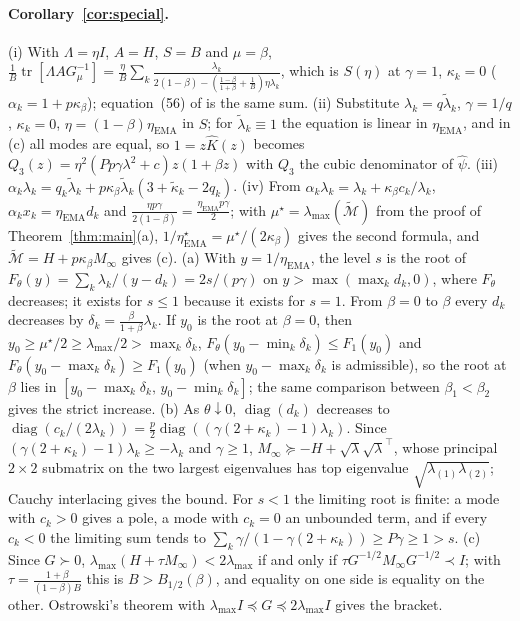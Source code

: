 \documentclass[11pt]{article}
\theoremstyle{remark}
\newcommand{\tr}{\operatorname{tr}}
\begin{document}
\paragraph{Corollary~\ref{cor:special}.}
(i) With $\Lambda=\eta I$, $A=H$, $S=B$ and $\mu=\beta$, $\frac1B\tr[\Lambda AG_\mu^{-1}]=\frac{\eta}{B}\sum_k\frac{\lambda_k}{2(1-\beta)-(\frac{1-\beta}{1+\beta}+\frac1B)\eta\lambda_k}$, which is $S(\eta)$ at $\gamma=1$, $\kappa_k=0$ ($\alpha_k=1+p\kappa_\beta$); equation~(56) of \citet{wang2026momentum} is the same sum. (ii) Substitute $\lambda_k=q\tilde\lambda_k$, $\gamma=1/q$, $\kappa_k=0$, $\eta=(1-\beta)\eta_{\mathrm{EMA}}$ in $S$; for $\tilde\lambda_k\equiv1$ the equation is linear in $\eta_{\mathrm{EMA}}$, and in (c) all modes are equal, so $1=z\widehat K(z)$ becomes $Q_3(z)=\eta^2(Pp\gamma\lambda^2+c)z(1+\beta z)$ with $Q_3$ the cubic denominator of $\widehat\psi$. (iii) $\alpha_k\lambda_k=q_k\tilde\lambda_k+p\kappa_\beta\tilde\lambda_k(3+\tilde\kappa_k-2q_k)$.
(iv) From $\alpha_k\lambda_k=\lambda_k+\kappa_\beta c_k/\lambda_k$, $\alpha_kx_k=\eta_{\mathrm{EMA}}d_k$ and $\frac{\eta p\gamma}{2(1-\beta)}=\frac{\eta_{\mathrm{EMA}}p\gamma}2$; with $\mu^\star=\lambda_{\max}(\widetilde{\mathcal M})$ from the proof of Theorem~\ref{thm:main}(a), $1/\eta^\star_{\mathrm{EMA}}=\mu^\star/(2\kappa_\beta)$ gives the second formula, and $\widetilde{\mathcal M}=H+p\kappa_\beta M_\infty$ gives (c). (a) With $y=1/\eta_{\mathrm{EMA}}$, the level $s$ is the root of $F_\theta(y)=\sum_k\lambda_k/(y-d_k)=2s/(p\gamma)$ on $y>\max(\max_kd_k,0)$, where $F_\theta$ decreases; it exists for $s\le1$ because it exists for $s=1$. From $\beta=0$ to $\beta$ every $d_k$ decreases by $\delta_k=\frac{\beta}{1+\beta}\lambda_k$. If $y_0$ is the root at $\beta=0$, then $y_0\ge\mu^\star/2\ge\lambda_{\max}/2>\max_k\delta_k$, $F_\theta(y_0-\min_k\delta_k)\le F_1(y_0)$ and $F_\theta(y_0-\max_k\delta_k)\ge F_1(y_0)$ (when $y_0-\max_k\delta_k$ is admissible), so the root at $\beta$ lies in $[y_0-\max_k\delta_k,\,y_0-\min_k\delta_k]$; the same comparison between $\beta_1<\beta_2$ gives the strict increase. (b) As $\theta\downarrow0$, $\operatorname{diag}(d_k)$ decreases to $\operatorname{diag}(c_k/(2\lambda_k))=\frac p2\operatorname{diag}((\gamma(2+\kappa_k)-1)\lambda_k)$. Since $(\gamma(2+\kappa_k)-1)\lambda_k\ge-\lambda_k$ and $\gamma\ge1$, $M_\infty\succeq-H+\sqrt\lambda\sqrt\lambda^\top$, whose principal $2\times2$ submatrix on the two largest eigenvalues has top eigenvalue $\sqrt{\lambda_{(1)}\lambda_{(2)}}$; Cauchy interlacing gives the bound. For $s<1$ the limiting root is finite: a mode with $c_k>0$ gives a pole, a mode with $c_k=0$ an unbounded term, and if every $c_k<0$ the limiting sum tends to $\sum_k\gamma/(1-\gamma(2+\kappa_k))\ge P\gamma\ge1>s$. (c) Since $G\succ0$, $\lambda_{\max}(H+\tau M_\infty)<2\lambda_{\max}$ if and only if $\tau G^{-1/2}M_\infty G^{-1/2}\prec I$; with $\tau=\frac{1+\beta}{(1-\beta)B}$ this is $B>B_{1/2}(\beta)$, and equality on one side is equality on the other. Ostrowski's theorem with $\lambda_{\max}I\preceq G\preceq2\lambda_{\max}I$ gives the bracket.
\end{document}
